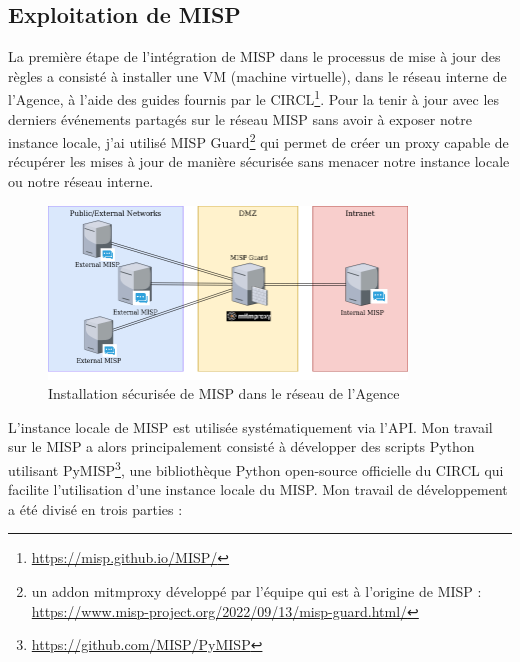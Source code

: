 \newpage

\subsection{Exploitation de MISP}

\vspace{1em}

La première étape de l'intégration de MISP dans le processus de mise à jour des règles a consisté à installer une VM (machine virtuelle), dans le réseau interne de l'Agence, à l'aide des guides fournis par le CIRCL\footnote{\url{https://misp.github.io/MISP/}}. Pour la tenir à jour avec les derniers événements partagés sur le réseau MISP sans avoir à exposer notre instance locale, j'ai utilisé MISP Guard\footnote{un addon mitmproxy développé par l'équipe qui est à l'origine de MISP : \url{https://www.misp-project.org/2022/09/13/misp-guard.html/}} qui permet de créer un proxy capable de récupérer les mises à jour de manière sécurisée sans menacer notre instance locale ou notre réseau interne.\\

\vspace{1em}

\begin{figure}[h]%
    \center%
    \includegraphics[width=0.85\textwidth]{assets/MispGard.png}
    \caption[Installation sécurisée de MISP dans le réseau de l'Agence (source: \url{https://www.misp-project.org/img/blog/misp-guard-architecture.png})]{Installation sécurisée de MISP dans le réseau de l'Agence}\label{fig:MispGard}
\end{figure}

L'instance locale de MISP est utilisée systématiquement via l'API. Mon travail sur le MISP a alors principalement consisté à développer des scripts Python utilisant PyMISP\footnote{\url{https://github.com/MISP/PyMISP}}, une bibliothèque Python open-source officielle du CIRCL qui facilite l'utilisation d'une instance locale du MISP. Mon travail de développement a été divisé en trois parties :\\

